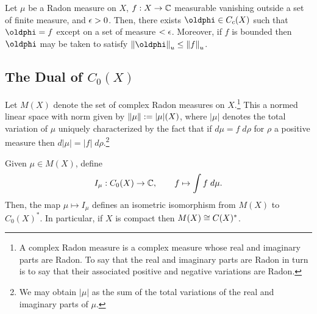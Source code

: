 \documentclass[11pt]{article}
\renewcommand{\phi}{\oldphi}
\begin{document}
\begin{theorem}[Lusin]
Let $\mu$ be a Radon measure on $X$, $f: X\to\mathbb{C}$ measurable vanishing outside a set of finite measure, and $\epsilon>0$. Then, there exists $\phi\in C_c(X)$ such that $\phi=f$ except on a set of measure $<\epsilon$. Moreover, if $f$ is bounded then $\phi$ may be taken to satisfy $\norm{\phi}_u\leq\norm{f}_u$.
\end{theorem}

\subsection{The Dual of $C_0(X)$}
Let $M(X)$ denote the set of complex Radon measures on $X$.\footnote{A complex Radon measure is a complex measure whose real and imaginary parts are Radon. To say that the real and imaginary parts are Radon in turn is to say that their associated positive and negative variations are Radon.} This a normed linear space with norm given by $\left\lVert\mu\right\rVert:=|\mu|(X)$, where $|\mu|$ denotes the total variation of $\mu$ uniquely characterized by the fact that if $d\mu=f\;d\rho$ for $\rho$ a positive measure then $d|\mu|=|f|\;d\rho$.\footnote{We may obtain $|\mu|$ as the sum of the total variations of the real and imaginary parts of $\mu$.}

\begin{theorem}
Given $\mu\in M(X)$, define
$$I_{\mu}: C_0(X)\to\mathbb{C},\qquad f\mapsto\int f\;d\mu.$$
Then, the map $\mu\mapsto I_{\mu}$ defines an isometric isomorphism from $M(X)$ to $C_0(X)^*$. In particular, if $X$ is compact then $M(X)\cong C(X)^*$.
\end{theorem}
\end{document}
